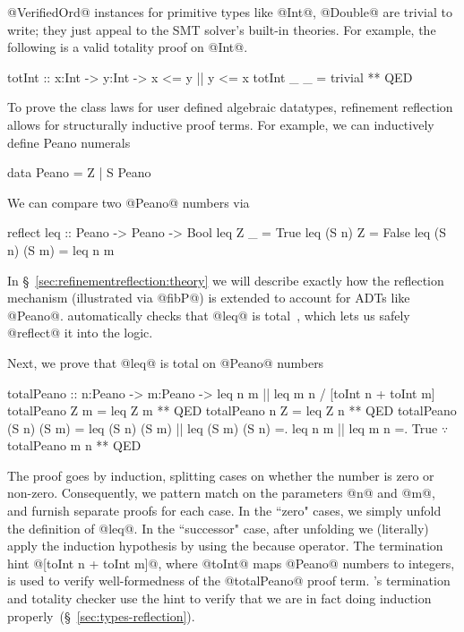 


@VerifiedOrd@ instances for primitive types like @Int@, @Double@ are trivial to
write; they just appeal to the SMT solver's built-in theories.
%
For example, the following is a valid totality proof on @Int@.
\begin{code}
  totInt :: x:Int -> y:Int -> {x <= y || y <= x}
  totInt _ _ = trivial ** QED
\end{code}

%
To prove the class laws for user defined algebraic datatypes,
refinement reflection allows for structurally inductive proof terms.
%
For example, we can inductively define Peano numerals
%
\begin{code}
  data Peano = Z | S Peano
\end{code}
%
We can compare two @Peano@ numbers via
\begin{code}
  reflect leq :: Peano -> Peano -> Bool
  leq Z _         = True
  leq (S n) Z     = False
  leq (S n) (S m) = leq n m
\end{code}
%
In \S~\ref{sec:refinementreflection:theory} we will describe
exactly how the reflection mechanism (illustrated
via @fibP@) is extended to account for ADTs like @Peano@.
%
\toolname automatically checks
that @leq@ is total~\citep{Vazou14}, which
lets us safely @reflect@ it into the logic.

Next, we prove that @leq@ is total on @Peano@ numbers
%
\begin{mcode}
  totalPeano :: n:Peano -> m:Peano -> {leq n m || leq m n} / [toInt n + toInt m]
  totalPeano Z m = leq Z m ** QED
  totalPeano n Z = leq Z n ** QED
  totalPeano (S n) (S m)
   =  leq (S n) (S m) || leq (S m) (S n)
   =. leq n m || leq m n
   =. True $\because$ totalPeano m n
   ** QED
\end{mcode}
The proof goes by induction, splitting cases on
whether the number is zero or non-zero. Consequently,
we pattern match on the parameters @n@ and @m@, and furnish
separate proofs for each case.
%
In the ``zero" cases, we simply unfold the definition
of @leq@.
%
In the ``successor" case, after unfolding we (literally)
apply the induction hypothesis by using the because operator.
%
The termination hint @[toInt n + toInt m]@,
where @toInt@ maps @Peano@ numbers to integers,
is used to verify well-formedness of the @totalPeano@
proof term.
%
\toolname's termination and totality checker
use the hint to
verify that we are in fact doing induction
properly~(\S~\ref{sec:types-reflection}).


